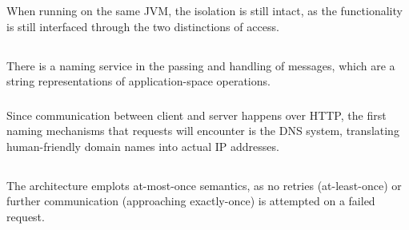 \documentclass[12pt]{article}
\begin{document}
\subsubsection{} %

When running on the same JVM, the isolation is still intact, as the functionality is still interfaced through the two distinctions of access.

\subsection{} %

\subsubsection{} %

There is a naming service in the passing and handling of messages, which are a string representations of application-space operations.

\subsubsection{} %

Since communication between client and server happens over HTTP, the first naming mechanisms that requests will encounter is the DNS system, translating human-friendly domain names into actual IP addresses.

\subsection{} %

The architecture emplots at-most-once semantics, as no retries (at-least-once) or further communication (approaching exactly-once) is attempted on a failed request.

\subsection{} %
\end{document}
